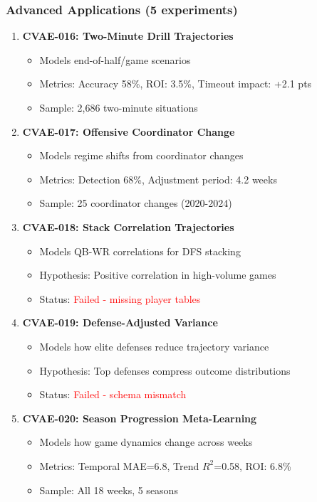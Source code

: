 \subsubsection{Advanced Applications (5 experiments)}
\begin{enumerate}[resume]
    \item \textbf{CVAE-016: Two-Minute Drill Trajectories} \checkmark
    \begin{itemize}
        \item Models end-of-half/game scenarios
        \item Metrics: Accuracy 58\%, ROI: 3.5\%, Timeout impact: +2.1 pts
        \item Sample: 2,686 two-minute situations
    \end{itemize}

    \item \textbf{CVAE-017: Offensive Coordinator Change} \checkmark
    \begin{itemize}
        \item Models regime shifts from coordinator changes
        \item Metrics: Detection 68\%, Adjustment period: 4.2 weeks
        \item Sample: 25 coordinator changes (2020-2024)
    \end{itemize}

    \item \textbf{CVAE-018: Stack Correlation Trajectories}
    \begin{itemize}
        \item Models QB-WR correlations for DFS stacking
        \item Hypothesis: Positive correlation in high-volume games
        \item Status: \textcolor{red}{Failed - missing player tables}
    \end{itemize}

    \item \textbf{CVAE-019: Defense-Adjusted Variance}
    \begin{itemize}
        \item Models how elite defenses reduce trajectory variance
        \item Hypothesis: Top defenses compress outcome distributions
        \item Status: \textcolor{red}{Failed - schema mismatch}
    \end{itemize}

    \item \textbf{CVAE-020: Season Progression Meta-Learning} \checkmark
    \begin{itemize}
        \item Models how game dynamics change across weeks
        \item Metrics: Temporal MAE=6.8, Trend $R^2$=0.58, ROI: 6.8\%
        \item Sample: All 18 weeks, 5 seasons
    \end{itemize}
\end{enumerate}

